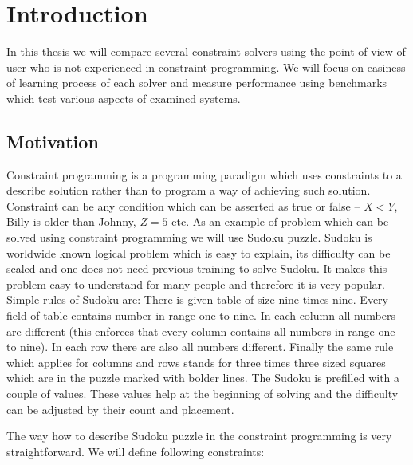 \chapter{Introduction}
\thispagestyle{myheadings}

In this thesis we will compare several constraint solvers using the point of view 
of user who is not experienced in constraint programming. We will focus on easiness 
of learning process of each solver and measure performance using benchmarks which 
test various aspects of examined systems. 

\section{Motivation}
Constraint programming is a programming paradigm which uses constraints to a 
describe solution rather than to program a way of achieving such solution. 
Constraint can be any condition which can be asserted as true or false -- $X < Y$, 
Billy is older than Johnny, $Z = 5$ etc.  As an example of problem which can be 
solved using constraint programming we will use Sudoku puzzle. Sudoku is worldwide 
known logical problem which is easy to explain, its difficulty can be scaled and 
one does not need previous training to solve Sudoku. It makes this problem easy 
to understand for many people and therefore it is very popular. Simple rules of 
Sudoku are: There is given table of size nine times nine. Every field of table 
contains number in range one to nine. In each column all numbers are different 
(this enforces that every column contains all numbers in range one to nine). In 
each row there are also all numbers different. Finally the same rule which applies 
for columns and rows stands for three times three sized squares which are in the 
puzzle marked with bolder lines. The Sudoku is prefilled with a couple of values. 
These values help at the beginning of solving and the difficulty can be 
adjusted by their count and placement.


The way how to describe Sudoku puzzle in the constraint programming is very 
straightforward. We will define following constraints:

